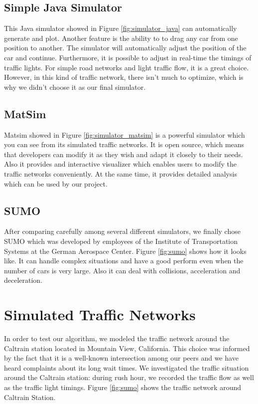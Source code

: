\documentclass{article} %
\begin{document}
\subsection{Simple Java Simulator}
This Java simulator showed in Figure \ref{fig:simulator_java} can automatically generate and plot. Another feature is the ability to to drag any car from one position to another. The simulator will automatically adjust the position of the car and continue. Furthermore, it is possible to adjust in real-time the timings of traffic lights. For simple road networks and light traffic flow, it is a great choice. However, in this kind of traffic network, there isn't much to optimize, which is why we didn't choose it as our final simulator. 
\subsection{MatSim}
Matsim showed in Figure \ref{fig:simulator_matsim} is a powerful simulator which you can see from its simulated traffic networks. It is open source, which means that developers can modify it as they wish and adapt it closely to their needs. Also it provides and interactive visualizer which enables users to modify the traffic networks conveniently. At the same time, it provides detailed analysis which can be used by our project.
\subsection{SUMO}
After comparing carefully among several different simulators, we finally chose SUMO which was developed by employees of the Institute of Transportation Systems at the German Aerospace Center. Figure \ref{fig:sumo} shows how it looks like. It can handle complex situations and have a good perform even when the number of cars is very large. Also it can deal with collisions, acceleration and deceleration.

\section{Simulated Traffic Networks}
In order to test our algorithm, we modeled the traffic network around the Caltrain station located in Mountain View, California. This choice was informed by the fact that it is a well-known intersection among our peers and we have heard complaints about its long wait times. We investigated the traffic situation around the Caltrain station: during rush hour, we recorded the traffic flow as well as the traffic light timings. Figure \ref{fig:sumo} shows the traffic network around Caltrain Station.
\end{document}
